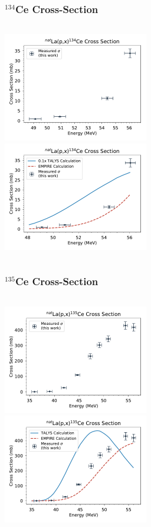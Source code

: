 \documentclass[12pt,xcolor=dvipsnames]{beamer}
\begin{document}
\begin{frame}
\frametitle{$^{134}$Ce Cross-Section}
\begin{columns}[c]
\column{2.5in}
\includegraphics[width=2.5in]{cross_sections/134CE_only}
\\
\column{2.5in}
\includegraphics[width=2.5in]{cross_sections/134CE}
\\
\end{columns}
\end{frame}

\begin{frame}
\frametitle{$^{135}$Ce Cross-Section}
\begin{columns}[c]
\column{2.5in}
\includegraphics[width=2.5in]{cross_sections/135CE_only}
\\
\column{2.5in}
\includegraphics[width=2.5in]{cross_sections/135CE}
\\
\end{columns}
\end{frame}
\end{document}
